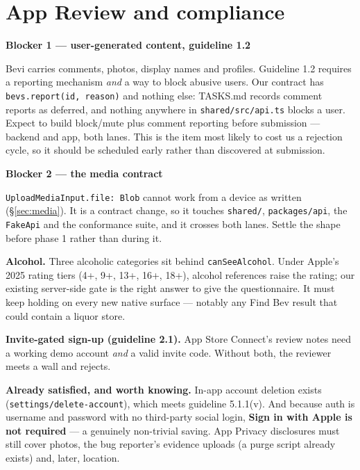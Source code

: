 \documentclass[11pt]{article}
\newcommand{\code}[1]{\texttt{\small #1}}
\begin{document}
\section{App Review and compliance}

\begin{warnbox}
\textbf{\color{accent}Blocker 1 --- user-generated content, guideline 1.2}

Bevi carries comments, photos, display names and profiles. Guideline 1.2 requires a reporting
mechanism \emph{and} a way to block abusive users. Our contract has \code{bevs.report(id, reason)}
and nothing else: TASKS.md records comment reports as deferred, and nothing anywhere in
\code{shared/src/api.ts} blocks a user. Expect to build block/mute plus comment reporting before
submission --- backend and app, both lanes. This is the item most likely to cost us a rejection
cycle, so it should be scheduled early rather than discovered at submission.
\end{warnbox}

\begin{warnbox}
\textbf{\color{accent}Blocker 2 --- the media contract}

\code{UploadMediaInput.file: Blob} cannot work from a device as written (\S\ref{sec:media}). It is a contract
change, so it touches \code{shared/}, \code{packages/api}, the \code{FakeApi} and the conformance
suite, and it crosses both lanes. Settle the shape before phase 1 rather than during it.
\end{warnbox}

\textbf{Alcohol.} Three alcoholic categories sit behind \code{canSeeAlcohol}. Under Apple's 2025
rating tiers (4+, 9+, 13+, 16+, 18+), alcohol references raise the rating; our existing server-side
gate is the right answer to give the questionnaire. It must keep holding on every new native surface
--- notably any Find Bev result that could contain a liquor store.

\textbf{Invite-gated sign-up (guideline 2.1).} App Store Connect's review notes need a working demo
account \emph{and} a valid invite code. Without both, the reviewer meets a wall and rejects.

\textbf{Already satisfied, and worth knowing.} In-app account deletion exists
(\code{settings/delete-account}), which meets guideline 5.1.1(v). And because auth is username and
password with no third-party social login, \textbf{Sign in with Apple is not required} --- a
genuinely non-trivial saving. App Privacy disclosures must still cover photos, the bug reporter's
evidence uploads (a purge script already exists) and, later, location.
\end{document}
